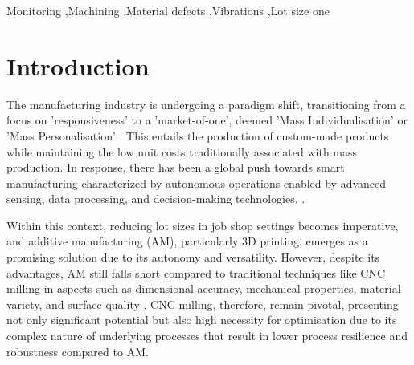 \documentclass[5p,times,procedia]{elsarticle}
\begin{document}
\begin{frontmatter}
\begin{keyword}
Monitoring \sep Machining \sep Material defects \sep Vibrations \sep Lot size one




\end{keyword}

\end{frontmatter}


\section{Introduction}\label{Sec_Introduction}


The manufacturing industry is undergoing a paradigm shift, transitioning from a focus on 'responsiveness' to a 'market-of-one', deemed 'Mass Individualisation' \cite{Lu.Xu.ea2020} or 'Mass Personalisation' \cite{Qin.Lu2021}. This entails the production of custom-made products while maintaining the low unit costs traditionally associated with mass production.
In response, there has been a global push towards smart manufacturing characterized by autonomous operations enabled by advanced sensing, data processing, and decision-making technologies. \cite{Gu.Koren2022, Lu.Morris.ea2016}.


Within this context, reducing lot sizes in job shop settings becomes imperative, and additive manufacturing (AM), particularly 3D printing, emerges as a promising solution due to its autonomy and versatility.
However, despite its advantages, AM still falls short compared to traditional techniques like CNC milling in aspects such as dimensional accuracy, mechanical properties, material variety, and surface quality \cite{Chen.Lin2017,zotero-232,zotero-236}.
CNC milling, therefore, remain pivotal, presenting not only significant potential but also high necessity for optimisation due to its complex nature of underlying processes that result in lower process resilience and robustness compared to AM.
\end{document}
